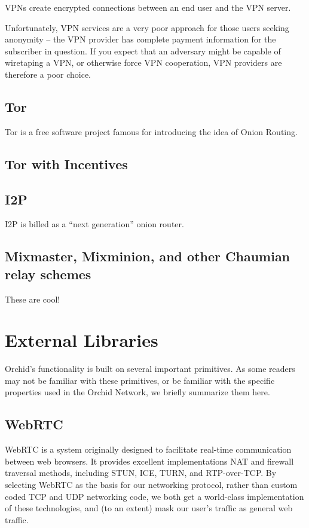 \documentclass{article}
\newcommand{\mesh}{Orchid}
\begin{document}
VPNs create encrypted connections between an end user and the VPN server.

Unfortunately, VPN services are a very poor approach for those users seeking anonymity – the VPN provider has complete payment information for the subscriber in question. If you expect that an adversary might be capable of wiretaping a VPN, or otherwise force VPN cooperation, VPN providers are therefore a poor choice.

\subsection{Tor}

Tor is a free software project famous for introducing the idea of Onion Routing.

\subsection{Tor with Incentives}

\subsection{I2P}

I2P is billed as a “next generation” onion router.

\subsection{Mixmaster, Mixminion, and other Chaumian relay schemes}

These are cool!


\section{External Libraries}
\label{sec:external-libraries}

\mesh{}’s functionality is built on several important primitives. As some readers may not be familiar with these primitives, or be familiar with the specific properties used in the \mesh{} Network, we briefly summarize them here.

\subsection{WebRTC}

WebRTC \cite{webrtc} is a system originally designed to facilitate real-time communication between web browsers. It provides excellent implementations NAT and firewall traversal methods, including STUN, ICE, TURN, and RTP-over-TCP. By selecting WebRTC as the basis for our networking protocol, rather than custom coded TCP and UDP networking code, we both get a world-class implementation of these technologies, and (to an extent) mask our user's traffic as general web traffic.
\end{document}
